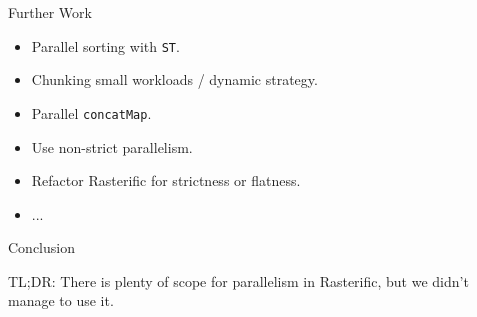 \documentclass[slidestop,compress,mathserif, xcolor=table]{beamer}
\begin{document}
\begin{frame}[c]{Further Work}

\begin{itemize}
\item Parallel sorting with \texttt{ST}.
\item Chunking small workloads / dynamic strategy.
\item Parallel \texttt{concatMap}.
\item Use non-strict parallelism.
\item Refactor Rasterific for strictness or flatness.
\item ...
\end{itemize}
\end{frame}

\begin{frame}[c]{Conclusion}

TL;DR: There is plenty of scope for parallelism in Rasterific, but we didn't manage to use it.

\end{frame}
\end{document}
